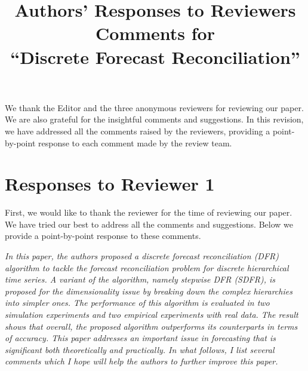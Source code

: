 \documentclass[11pt,a4paper]{article}
\title{\bf\Large Authors' Responses to Reviewers Comments for \\
  ``Discrete Forecast Reconciliation'' }
\author{}
\date{}
\newcommand{\RE}[2][Re:~]{{\color{blue}\textbf{#1}#2}}
\begin{document}
\maketitle

\RE[]{We thank the Editor and the three anonymous reviewers for reviewing our paper. We are also grateful for the insightful comments and suggestions. In this revision, we have addressed all the comments raised by the reviewers, providing a point-by-point response to each comment made by the review team.}

\section*{Responses to Reviewer 1}\label{reviewer-1-comments}

\RE[]{First, we would like to thank the reviewer for the time of reviewing our paper. We have tried our best to address all the comments and suggestions. Below we provide a point-by-point response to these comments.}

\textit{In this paper, the authors proposed a discrete forecast reconciliation (DFR) algorithm to tackle the forecast reconciliation problem for discrete hierarchical time series. A variant of the algorithm, namely stepwise DFR (SDFR), is proposed for the dimensionality issue by breaking down the complex hierarchies into simpler ones. The performance of this algorithm is evaluated in two simulation experiments and two empirical experiments with real data. The result shows that overall, the proposed algorithm outperforms its counterparts in terms of accuracy. This paper addresses an important issue in forecasting that is significant both theoretically and practically. In what follows, I list several comments which I hope will help the authors to further improve this paper.}
\end{document}
